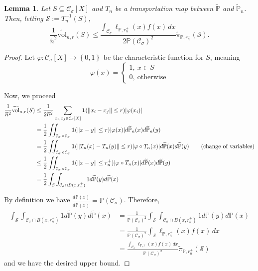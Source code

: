 \documentclass[11pt,twoside]{article}
\newtheorem{lemma}{Lemma}
\DeclarePairedDelimiter\abs{\lvert}{\rvert}
\newcommand{\set}[1]{\left\{#1\right\}}
\newcommand{\vol}{\mathrm{vol}}
\newcommand{\norm}[1]{\left\lVert#1\right\rVert}
\newcommand{\1}{\mathbf{1}}
\newcommand{\Xbf}{X}             %
\newcommand{\Pbb}{\mathbb{P}}
\newcommand{\Sset}{\mathcal{S}}
\newcommand{\Cset}{\mathcal{C}}
\newcommand{\Csig}{\Cset_{\sigma}}
\newcommand{\dx}{\,dx}
\newcommand{\piwt}{\widetilde{\pi}}
\begin{document}
\begin{lemma}
	\label{lem: volume_bound}
	Let $S \subseteq \Csig[\Xbf]$ and $T_n$ be a transportation map between $\widetilde{\Pbb}$ and $\widetilde{\Pbb}_n$. Then, letting $\Sset := T_n^{-1}(S)$,
	\begin{equation*}
	\frac{1}{\widetilde{n}^2}\widetilde{\vol}_{n,r}(S) \leq \frac{\int_{\Csig} \ell_{\Pbb,r_n^+}(x) f(x) \dx}{2 \Pbb(\Csig)^2} \piwt_{\Pbb,r_n^+}(\Sset).
	\end{equation*}
\end{lemma}
\begin{proof}
	Let $\varphi: \Csig[\Xbf] \to \set{0,1}$ be the characteristic function for $S$, meaning
	\begin{equation*}
	\varphi(x) = 
	\begin{cases}
	1,~ x \in S \\
	0,~ \text{otherwise}
	\end{cases}
	\end{equation*}
	
	Now, we proceed
	\begin{align}
	\frac{1}{\widetilde{n}^2} \widetilde{\vol}_{n,r}(S) & \leq \frac{1}{2 \widetilde{n}^2} \sum_{x_i, x_j \in \Csig[\Xbf]} \1(\norm{x_i - x_j} \leq r) \abs{\varphi(x_i)} \nonumber \\
	& = \frac{1}{2}\iint_{\Csig \times \Csig} \1(\norm{x - y} \leq r) \abs{\varphi(x)} d\widetilde{\Pbb}_n(x) d\widetilde{\Pbb}_n(y) \nonumber \\
	& = \frac{1}{2} \iint_{\Csig \times \Csig} \1(\norm{T_n(x) - T_n(y)} \leq r) \abs{\varphi \circ T_n(x)} d\widetilde{\Pbb}(x) d\widetilde{\Pbb}(y) \tag{change of variables} \nonumber \\
	& \leq \frac{1}{2}\iint_{\Csig \times \Csig} \1(\norm{x - y} \leq r_n^+) \abs{\varphi \circ T_n(x)} d\widetilde{\Pbb}(x) d\widetilde{\Pbb}(y) \nonumber \\
	& = \frac{1}{2}\int_{\Sset} \int_{\Csig \cap B(x,r_n^+)} 1 d\widetilde{\Pbb}(y) d\widetilde{\Pbb}(x) \nonumber
	\end{align}
	
	By definition we have $\frac{d\Pbb(x)}{d\widetilde{\Pbb}(x)} = \Pbb(\Csig)$. Therefore,
	\begin{align*}
	\int_{\Sset} \int_{\Csig \cap B(x,r_n^+)} 1 d\widetilde{\Pbb}(y) d\widetilde{\Pbb}(x) & = \frac{1}{\Pbb(\Csig)^2}\int_{\Sset} \int_{\Csig \cap B(x,r_n^+)} 1 d\Pbb(y) d\Pbb(x) \\
	& = \frac{1}{\Pbb(\Csig)^2}\int_{\Sset} \ell_{\Pbb,r_n^+}(x) f(x) \dx \\
	& = \frac{\int_{\Csig} \ell_{\Pbb,r}(x) f(x) \dx}{\Pbb(\Csig)^2} \piwt_{\Pbb,r_n^+}(\Sset)
	\end{align*}
	and we have the desired upper bound.
\end{proof}
\end{document}
